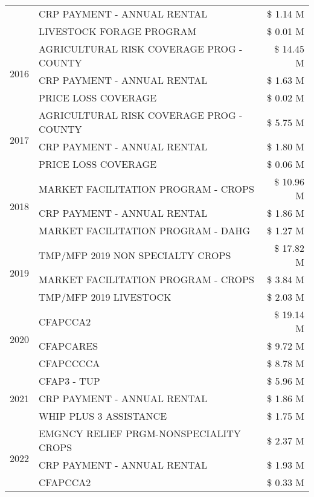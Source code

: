 \begin{tabular}{llr}
 & CRP PAYMENT - ANNUAL RENTAL & \$ 1.14 M \\
 & LIVESTOCK FORAGE PROGRAM & \$ 0.01 M \\
\cline{1-3}
\multirow[t]{3}{*}{2016} & AGRICULTURAL RISK COVERAGE PROG - COUNTY & \$ 14.45 M \\
 & CRP PAYMENT - ANNUAL RENTAL & \$ 1.63 M \\
 & PRICE LOSS COVERAGE & \$ 0.02 M \\
\cline{1-3}
\multirow[t]{3}{*}{2017} & AGRICULTURAL RISK COVERAGE PROG - COUNTY & \$ 5.75 M \\
 & CRP PAYMENT - ANNUAL RENTAL & \$ 1.80 M \\
 & PRICE LOSS COVERAGE & \$ 0.06 M \\
\cline{1-3}
\multirow[t]{3}{*}{2018} & MARKET FACILITATION PROGRAM - CROPS & \$ 10.96 M \\
 & CRP PAYMENT - ANNUAL RENTAL & \$ 1.86 M \\
 & MARKET FACILITATION PROGRAM - DAHG & \$ 1.27 M \\
\cline{1-3}
\multirow[t]{3}{*}{2019} & TMP/MFP 2019 NON SPECIALTY CROPS & \$ 17.82 M \\
 & MARKET FACILITATION PROGRAM - CROPS & \$ 3.84 M \\
 & TMP/MFP 2019 LIVESTOCK & \$ 2.03 M \\
\cline{1-3}
\multirow[t]{3}{*}{2020} & CFAPCCA2 & \$ 19.14 M \\
 & CFAPCARES & \$ 9.72 M \\
 & CFAPCCCCA & \$ 8.78 M \\
\cline{1-3}
\multirow[t]{3}{*}{2021} & CFAP3 - TUP & \$ 5.96 M \\
 & CRP PAYMENT - ANNUAL RENTAL & \$ 1.86 M \\
 & WHIP PLUS 3 ASSISTANCE & \$ 1.75 M \\
\cline{1-3}
\multirow[t]{3}{*}{2022} & EMGNCY RELIEF PRGM-NONSPECIALITY CROPS & \$ 2.37 M \\
 & CRP PAYMENT - ANNUAL RENTAL & \$ 1.93 M \\
 & CFAPCCA2 & \$ 0.33 M \\
\cline{1-3}
\bottomrule
\end{tabular}
